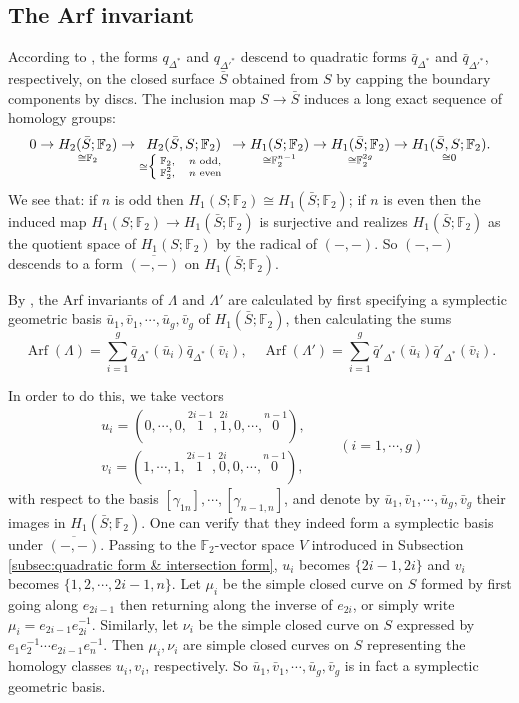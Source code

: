 \documentclass[11pt,reqno]{amsart}
\theoremstyle{plain}
\theoremstyle{definition}
\theoremstyle{remark}
\numberwithin{equation}{section}
\begin{document}
\subsection{The Arf invariant}
\par According to \cite[Lemma 7.5]{APS}, the forms $q_{\Delta^*}$ and $q_{\Delta'^*}$ descend to quadratic forms $\bar q_{\Delta^*}$ and $\bar q_{\Delta'^*}$, respectively, on the closed surface $\bar S$ obtained from $S$ by capping the boundary components by discs. The inclusion map $S\to\bar S$ induces a long exact sequence of homology groups:
\[0
    \to\underset{\cong\mathbb{F}_2}{H_2(\bar S;\mathbb{F}_2)}
    \to\underset{\cong\Big\{\!\!\scriptsize\begin{array}{ll}
        \mathbb{F}_2, &n \text{ odd}, \\
        \mathbb{F}_2^2, &n \text{ even}
    \end{array}}{H_2(\bar S,S;\mathbb{F}_2)}
    \to\underset{\cong\mathbb{F}_2^{n-1}}{H_1(S;\mathbb{F}_2)}
    \to\underset{\cong\mathbb{F}_2^{2g}}{H_1(\bar S;\mathbb{F}_2)}
    \to\underset{\cong0}{H_1(\bar S,S;\mathbb{F}_2)}.
\]
We see that: if $n$ is odd then $H_1(S;\mathbb{F}_2)\cong H_1(\bar S;\mathbb{F}_2)$; if $n$ is even then the induced map $H_1(S;\mathbb{F}_2)\to H_1(\bar S;\mathbb{F}_2)$ is surjective and realizes $H_1(\bar S;\mathbb{F}_2)$ as the quotient space of $H_1(S;\mathbb{F}_2)$ by the radical of $(-,-)$. So $(-,-)$ descends to a form $\overline{(-,-)}$ on $H_1(\bar S;\mathbb{F}_2)$.
\par By \cite[Lemma 7.5]{APS}, the Arf invariants of $\Lambda$ and $\Lambda'$ are calculated by first specifying a symplectic geometric basis $\bar u_1,\bar v_1,\cdots,\bar u_g,\bar v_g$ of $H_1(\bar S;\mathbb{F}_2)$, then calculating the sums
    \[\mathop{\mathrm{Arf}}(\Lambda)=\sum_{i=1}^g\bar q_{\Delta^*}(\bar u_i)\bar q_{\Delta^*}(\bar v_i),\quad
    \mathop{\mathrm{Arf}}(\Lambda')=\sum_{i=1}^g\bar q'_{\Delta^*}(\bar u_i)\bar q'_{\Delta^*}(\bar v_i).\]
\par In order to do this, we take vectors
\[\begin{aligned}
    u_i=(0,\cdots,0,\overset{2i-1}{1},\overset{2i}{1},0,\cdots,\overset{n-1}{0}),\\
    v_i=(1,\cdots,1,\overset{2i-1}{1},\overset{2i}{0},0,\cdots,\overset{n-1}{0}),
\end{aligned}\qquad(i=1,\cdots,g)\]
with respect to the basis $[\gamma_{1n}],\cdots,[\gamma_{n-1,n}]$, and denote by $\bar u_1,\bar v_1,\cdots,\bar u_g,\bar v_g$ their images in $H_1(\bar S;\mathbb{F}_2)$. One can verify that they indeed form a symplectic basis under $\overline{(-,-)}$. Passing to the $\mathbb{F}_2$-vector space $V$ introduced in Subsection \ref{subsec:quadratic form & intersection form}, $u_i$ becomes $\{2i-1,2i\}$ and $v_i$ becomes $\{1,2,\cdots,2i-1,n\}$. Let $\mu_i$ be the simple closed curve on $S$ formed by first going along $e_{2i-1}$ then returning along the inverse of $e_{2i}$, or simply write $\mu_i=e_{2i-1}e_{2i}^{-1}$. Similarly, let $\nu_i$ be the simple closed curve on $S$ expressed by $e_1e_2^{-1}\cdots e_{2i-1}e_{n}^{-1}$. Then $\mu_i,\nu_i$ are simple closed curves on $S$ representing the homology classes $u_i,v_i$, respectively. So $\bar u_1,\bar v_1,\cdots,\bar u_g,\bar v_g$ is in fact a symplectic geometric basis.
\end{document}
